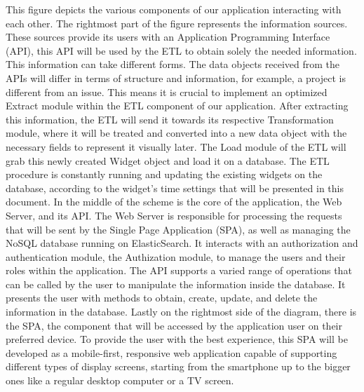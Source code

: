 \documentclass[a4paper,twoside,10pt]{report}
\begin{document}
This figure depicts the various components of our application interacting with each other.
\newline
The rightmost part of the figure represents the information sources. These sources provide its users with an Application Programming Interface (API), this API will be used by the  ETL to obtain solely the needed information.
\newline
This information can take different forms. The data objects received from the APIs will differ in terms of structure and information, for example, a project is different from an issue. This means it is crucial to implement an optimized Extract module within the ETL component of our application.
\newline
After extracting this information, the ETL will send it towards its respective Transformation module, where it will be treated and converted into a new data object with the necessary fields to represent it visually later.
\newline
The Load module of the ETL will grab this newly created Widget object and load it on a database.
\newline
The ETL procedure is constantly running and updating the existing widgets on the database, according to the widget's time settings that will be presented in this document.
\newline
In the middle of the scheme is the core of the application, the Web Server, and its API.
\newline
The Web Server is responsible for processing the requests that will be sent by the Single Page Application (SPA), as well as managing the NoSQL database running on ElasticSearch\cite{ES}.
\newline
It interacts with an authorization and authentication module, the Authization module, to manage the users and their roles within the application.
\newline
The API supports a varied range of operations that can be called by the user to manipulate the information inside the database. It presents the user with methods to obtain, create, update, and delete the information in the database.
\newline
Lastly on the rightmost side of the diagram, there is the SPA, the component that will be accessed by the application user on their preferred device.
\newline
To provide the user with the best experience, this SPA will be developed as a mobile-first, responsive web application capable of supporting different types of display screens, starting from the smartphone up to the bigger ones like a regular desktop computer or a TV screen.
\end{document}
